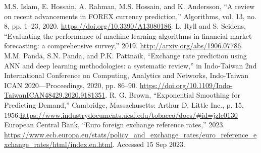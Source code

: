 \documentclass[conference]{IEEEtran}
\begin{document}
\begin{thebibliography}{00}
 M.S. Islam, E. Hossain, A. Rahman, M.S. Hossain, and K. Andersson, ``A review on recent advancements in FOREX currency prediction,'' Algorithms, vol. 13, no. 8, pp. 1--23, 2020. \url{https://doi.org/10.3390/A13080186}.
 L. Ryll and S. Seidens, ``Evaluating the performance of machine learning algorithms in financial market forecasting: a comprehensive survey,'' 2019. \url{http://arxiv.org/abs/1906.07786}.
 M.M. Panda, S.N. Panda, and P.K. Pattnaik, ``Exchange rate prediction using ANN and deep learning methodologies: a systematic review,'' in Indo-Taiwan 2nd International Conference on Computing, Analytics and Networks, Indo-Taiwan ICAN 2020—Proceedings, 2020, pp. 86--90. \url{https://doi.org/10.1109/Indo-TaiwanICAN48429.2020.9181351}.
 R. G. Brown, ``Exponential Smoothing for Predicting Demand,'' Cambridge, Massachusetts: Arthur D. Little Inc., p. 15, 1956.\url{https://www.industrydocuments.ucsf.edu/tobacco/docs/#id=jzlc0130}
 European Central Bank, ``Euro foreign exchange reference rates,'' 2023. \url{https://www.ecb.europa.eu/stats/policy_and_exchange_rates/euro_reference_exchange_rates/html/index.en.html}. Accessed 15 Sep 2023.
\end{thebibliography}
\end{document}
